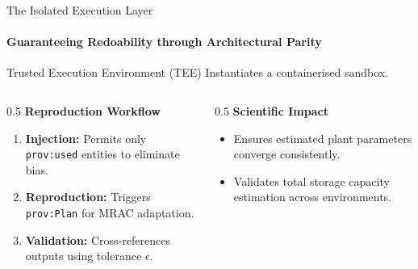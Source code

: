 \documentclass[aspectratio=169]{beamer}
\begin{document}
\begin{frame}{The Isolated Execution Layer}
    \framesubtitle{Guaranteeing Redoability through Architectural Parity}
    
    \begin{exampleblock}{Trusted Execution Environment (TEE)}
        Instantiates a containerised sandbox.
    \end{exampleblock}

    \begin{columns}[t]
        \begin{column}{0.5\textwidth}
            \textbf{Reproduction Workflow}
            \begin{enumerate}
                \item \textbf{Injection:} Permits only \texttt{prov:used} entities to eliminate bias.
                \item \textbf{Reproduction:} Triggers \texttt{prov:Plan} for MRAC adaptation.
                \item \textbf{Validation:} Cross-references outputs using tolerance $\epsilon$.
            \end{enumerate}
        \end{column}
        \begin{column}{0.5\textwidth}
            \textbf{Scientific Impact}
            \begin{itemize}
                \item Ensures estimated plant parameters converge consistently.
                \item Validates total storage capacity estimation across environments.
            \end{itemize}
        \end{column}
    \end{columns}
\end{frame}
\end{document}
